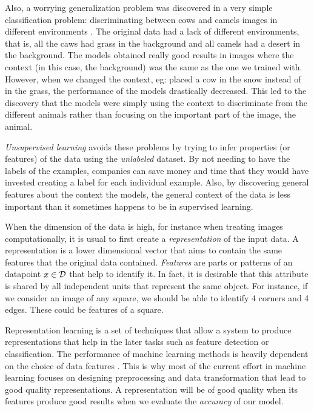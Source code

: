 Also, a worrying generalization problem was discovered in a very simple classification problem: discriminating between cows and camels images in different environments \citep{beery2018recognition}. The original data had a lack of different environments, that is, all the caws had grass in the background and all camels had a desert in the background. The models obtained really good results in images where the context (in this case, the background) was the same as the one we trained with. However, when we changed the context, eg: placed a cow in the snow instead of in the grass, the performance of the models drastically decreased. This led to the discovery that the models were simply using the context to discriminate from the different animals rather than focusing on the important part of the image, the animal.

\emph{Unsupervised learning} avoids these problems by trying to infer properties (or features) of the data using the \emph{unlabeled} dataset. By not needing to have the labels of the examples, companies can save money and time that they would have invested creating a label for each individual example. Also, by discovering general features about the context the models, the general context of the data is less important than it sometimes happens to be in supervised learning.

When the dimension of the data is high, for instance when treating images computationally, it is usual to first create a \emph{representation} of the input data. A representation is a lower dimensional vector that aims to contain the same features that the original data contained. \emph{Features} are parts or patterns of an datapoint $x \in \mathcal{D}$ that help to identify it. In fact, it is desirable that this attribute is shared by all independent units that represent the same object. For instance, if we consider an image of any square, we should be able to identify 4 corners and 4 edges. These could be features of a square.

Representation learning is a set of techniques that allow a system to produce representations that help in the later tasks such as feature detection or classification.
The performance of machine learning methods is heavily dependent on the choice of data features \citep{bengio_representation_2014}. This is why most of the current 
effort in machine learning focuses on designing preprocessing and data transformation that lead to good quality representations. A representation will be of good quality when its features
produce good results when we evaluate the \emph{accuracy} of our model.

